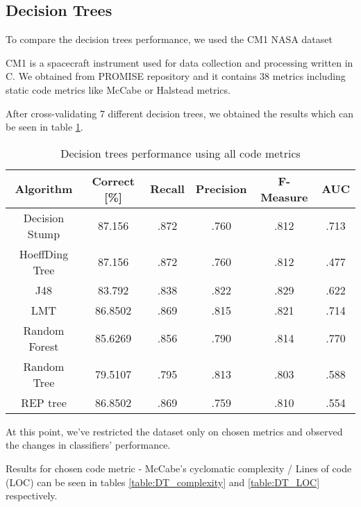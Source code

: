 \subsection{Decision Trees}
To compare the decision trees performance, we used the CM1 NASA dataset

CM1 is a spacecraft instrument used for data collection and processing written in C. We obtained from PROMISE repository and it contains 38 metrics including static code metrics like McCabe or Halstead metrics.

After cross-validating 7 different decision trees, we obtained the results which can be seen in table \ref{table:DT_allMetrics}.


\begin{table}[h!]
\centering
\begin{tabular}{ |c|c|c|c|c|c| } 
 \hline
 \textbf{Algorithm} & \textbf{Correct [\%]} & \textbf{Recall} & \textbf{Precision} & \textbf{F-Measure} & \textbf{AUC}  \\ 
 \hline
 Decision Stump & \textcolor{myRed}{87.156} & \textcolor{myRed}{.872} & .760 & .812 & .713   \\ 
 \hline
 HoeffDing Tree & \textcolor{myRed}{87.156} & \textcolor{myRed}{.872} & .760 & .812 & .477   \\ 
 \hline
  J48 & 83.792 & .838 & \textcolor{myRed}{.822} & \textcolor{myRed}{.829} & .622   \\ 
 \hline
  LMT & 86.8502 & .869 & .815 & .821 & .714    \\ 
 \hline
  Random Forest & 85.6269 & .856 & .790 & .814 & \textcolor{myRed}{.770}   \\ 
 \hline
  Random Tree & 79.5107 & .795 & .813 & .803 & .588   \\ 
 \hline
 REP tree  & 86.8502 & .869 & .759 & .810 & .554   \\ 
 \hline
\end{tabular}
\caption{Decision trees performance using all code metrics}
\label{table:DT_allMetrics}
\end{table}


At this point, we've restricted the dataset only on chosen metrics and observed the changes  in classifiers' performance.

Results for chosen code metric - McCabe's cyclomatic complexity / Lines of code (LOC) can be seen in tables \ref{table:DT_complexity} and \ref{table:DT_LOC} respectively.

